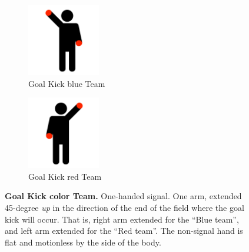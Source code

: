         \begin{figure}[ht!]
            \centering
            \begin{subfigure}{.33\textwidth}
                \centering
                \includegraphics[height=120px]{figs/referee-signals/goal-kick.png}
                \caption{\color{blue}Goal Kick \textlangle{}blue\textrangle{} Team}
            \end{subfigure}
            \begin{subfigure}{.33\textwidth}
                \centering
                \includegraphics[height=120px]{figs/referee-signals/goal-kick-flipped.png}
                \caption{\color{red}Goal Kick \textlangle{}red\textrangle{} Team}
            \end{subfigure}
            \caption{\textbf{Goal Kick \textlangle{}color\textrangle{} Team.} One-handed signal. One arm, extended 45-degree \emph{up} in the direction of the end of the field where the goal kick will occur. That is, right arm extended for the ``Blue team'', and left arm extended for the ``Red team''. The non-signal hand is flat and motionless by the side of the body.}
        \end{figure}

